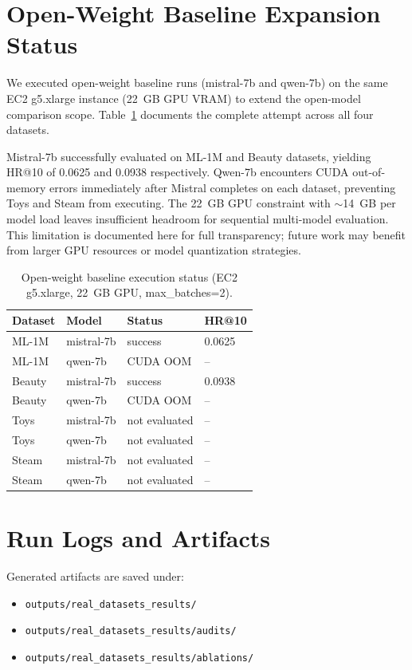\documentclass[11pt]{article}
\begin{document}
\section{Open-Weight Baseline Expansion Status}
We executed open-weight baseline runs (mistral-7b and qwen-7b) on the same EC2 g5.xlarge
instance (22~GB GPU VRAM) to extend the open-model comparison scope. Table~\ref{tab:open_weight_status}
documents the complete attempt across all four datasets.

Mistral-7b successfully evaluated on ML-1M and Beauty datasets, yielding HR@10 of 0.0625 and 0.0938
respectively. Qwen-7b encounters CUDA out-of-memory errors immediately after Mistral completes on each
dataset, preventing Toys and Steam from executing. The 22~GB GPU constraint with $\sim$14~GB per model
load leaves insufficient headroom for sequential multi-model evaluation. This limitation is documented
here for full transparency; future work may benefit from larger GPU resources or model quantization strategies.

\begin{table}[h]
\centering
\caption{Open-weight baseline execution status (EC2 g5.xlarge, 22~GB GPU, max\_batches=2).}
\label{tab:open_weight_status}
\begin{tabular}{llll}
\toprule
Dataset & Model & Status & HR@10 \\
\midrule
ML-1M  & mistral-7b & success & 0.0625 \\
ML-1M  & qwen-7b    & CUDA OOM & -- \\
Beauty & mistral-7b & success & 0.0938 \\
Beauty & qwen-7b    & CUDA OOM & -- \\
Toys   & mistral-7b & not evaluated & -- \\
Toys   & qwen-7b    & not evaluated & -- \\
Steam  & mistral-7b & not evaluated & -- \\
Steam  & qwen-7b    & not evaluated & -- \\
\bottomrule
\end{tabular}
\end{table}

\section{Run Logs and Artifacts}
Generated artifacts are saved under:
\begin{itemize}[leftmargin=*]
  \item \texttt{outputs/real\_datasets\_results/}
  \item \texttt{outputs/real\_datasets\_results/audits/}
  \item \texttt{outputs/real\_datasets\_results/ablations/}
\end{itemize}
\end{document}
